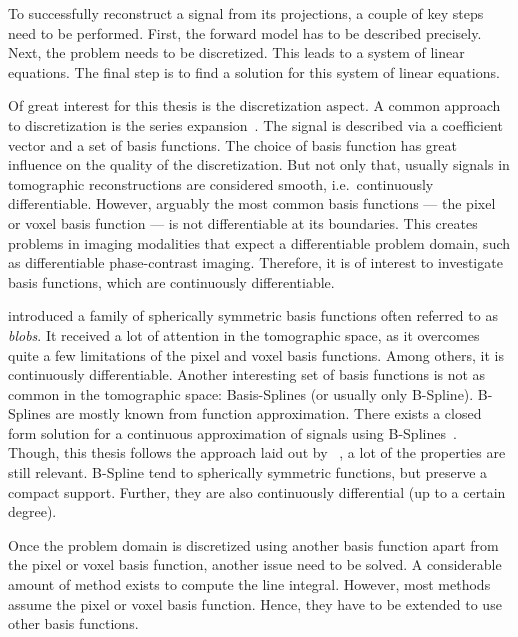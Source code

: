 To successfully reconstruct a signal from its projections, a couple of key steps need to be
performed. First, the forward model has to be described precisely. Next, the problem needs to be
discretized. This leads to a system of linear equations. The final step is to find a solution for
this system of linear equations.

Of great interest for this thesis is the discretization aspect. A common approach to discretization
is the series expansion~\cite{herman_basis_2015}. The signal is described via a coefficient vector
and a set of basis functions. The choice of basis function has great influence on the quality of the
discretization. But not only that, usually signals in tomographic reconstructions are considered
smooth, i.e.\ continuously differentiable. However, arguably the most common basis functions --- the
pixel or voxel basis function --- is not differentiable at its boundaries. This creates problems
in imaging modalities that expect a differentiable problem domain, such as differentiable
phase-contrast imaging. Therefore, it is of interest to investigate basis functions, which are
continuously differentiable.

\citeauthor*{lewitt_multidimensional_1990} introduced a family of spherically symmetric basis
functions often referred to as \textit{blobs}. It received a lot of attention in the tomographic
space, as it overcomes quite a few limitations of the pixel and voxel basis functions. Among
others, it is continuously differentiable. Another interesting set of basis functions is not as
common in the tomographic space: Basis-Splines (or usually only B-Spline). B-Splines are mostly
known from function approximation. There exists a closed form solution for a continuous
approximation of signals using B-Splines~\cite{unser_fast_1991}. Though, this thesis follows the
approach laid out by \citeauthor*{momey_new_2011}~\cite{momey_new_2011,momey_b-spline_2012,
	momey_spline_2015}, a lot of the properties are still relevant. B-Spline tend to spherically
symmetric functions, but preserve a compact support. Further, they are also continuously
differential (up to a certain degree).

Once the problem domain is discretized using another basis function apart from the pixel or
voxel basis function, another issue need to be solved. A considerable amount of method exists to
compute the line integral. However, most methods assume the pixel or voxel basis function. Hence,
they have to be extended to use other basis functions.

